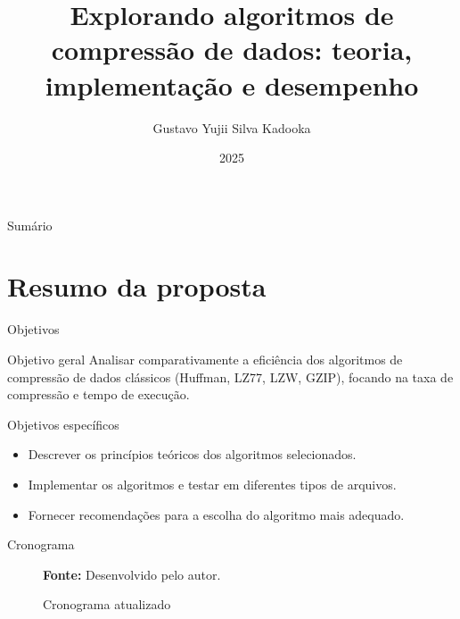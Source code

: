 \documentclass{beamer}
\title[Progresso do TCC]{Explorando algoritmos de compressão de dados: teoria, implementação e desempenho}
\author[Gustavo Kadooka]{Gustavo Yujii Silva Kadooka}
\institute[UNESP]{Universidade Estadual Paulista - Câmpus Bauru}
\date{2025}
\begin{document}
\begin{frame}
    \titlepage
\end{frame}

\begin{frame}{Sum\'ario}
    \tableofcontents
\end{frame}

\section{Resumo da proposta}
\begin{frame}{Objetivos}
    \begin{block}{Objetivo geral}
        Analisar comparativamente a eficiência dos algoritmos de compressão de dados clássicos (Huffman, LZ77, LZW, GZIP), focando na taxa de compressão e tempo de execução.
    \end{block}
    \begin{block}{Objetivos específicos}
        \begin{itemize}
            \item Descrever os princípios teóricos dos algoritmos selecionados.
            \item Implementar os algoritmos e testar em diferentes tipos de arquivos.
            \item Fornecer recomendações para a escolha do algoritmo mais adequado.
        \end{itemize}
    \end{block}
\end{frame}

\begin{frame}{Cronograma}
    \begin{figure}
        \caption{Cronograma atualizado}
        \centering
        \vspace{0.5em}
        {\footnotesize \textbf{Fonte:} Desenvolvido pelo autor.}
    \end{figure}
\end{frame}
\end{document}
